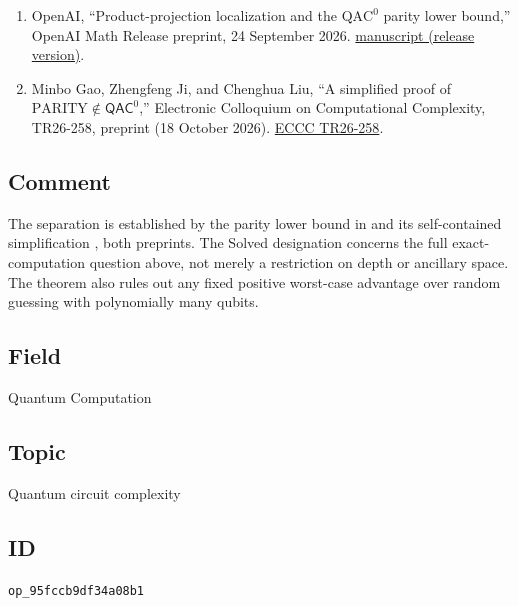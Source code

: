 \begin{enumerate}[label={},leftmargin=4.8em,labelsep=0.5em]
  \item[\textup{[OAI26]}]\label{ref:95fc-openai-parity}
  OpenAI, ``Product-projection localization and the $\mathrm{QAC}^0$ parity lower bound,'' OpenAI Math Release preprint, 24 September 2026.
\href{https://github.com/openai/math/blob/adc7f1241b42e322a6451854ab7e4b4c146bf78a/preprints/Product-projection-localization-and-the-QAC0-parity-lower-bound-September-24-2026/paper.pdf}{manuscript (release version)}.

  \item[\textup{[GJL26]}]\label{ref:95fc-gjl}
  Minbo Gao, Zhengfeng Ji, and Chenghua Liu,
``A simplified proof of $\mathrm{PARITY}\notin\mathsf{QAC}^0$,''
Electronic Colloquium on Computational Complexity, TR26-258, preprint
(18 October 2026).
\href{https://eccc.weizmann.ac.il/report/2026/258/}{ECCC TR26-258}.
\end{enumerate}

\subsection*{Comment}

The separation is established by the parity lower bound in
 and its self-contained
simplification , both preprints.
The Solved designation concerns the full exact-computation question above,
not merely a restriction on depth or ancillary space.
The theorem also rules out any fixed positive worst-case advantage over
random guessing with polynomially many qubits.

\subsection*{Field}

Quantum Computation

\subsection*{Topic}

Quantum circuit complexity

\subsection*{ID}

\texttt{op\_95fccb9df34a08b1}
